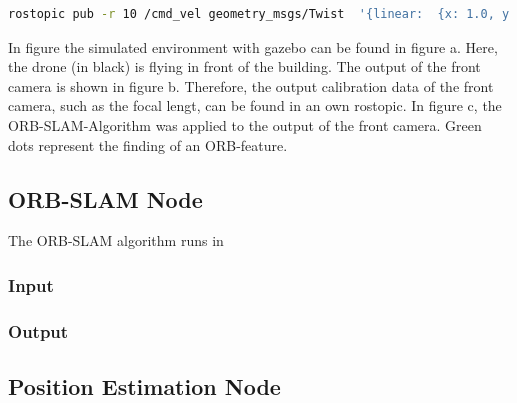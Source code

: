 	\begin{lstlisting}[language=bash, caption=drone navigation command, label=lst:drone_cmd]
    rostopic pub -r 10 /cmd_vel geometry_msgs/Twist  '{linear:  {x: 1.0, y: 0.0, z: 0.0}, angular: {x: 0.0,y: 0.0,z: 0.0}}'
	\end{lstlisting}
	
	
	
	In figure \cite{fig:simfigs} the simulated environment with gazebo can be found in figure a. Here, the drone (in black) is flying in front of the building. 
	The output of the front camera is shown in figure b. Therefore, the output calibration data of the front camera, such as the focal lengt, 
	can be found in an own rostopic. In figure c, the ORB-SLAM-Algorithm was applied to the output of the front camera. Green dots represent the 
	finding of an ORB-feature. 
	
	\subsection{ORB-SLAM Node}
	
	The ORB-SLAM algorithm runs in 
	
	\subsubsection{Input}
	\subsubsection{Output}
	
	\subsection{Position Estimation Node}
	
